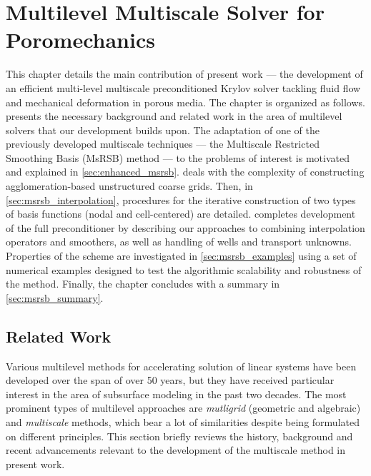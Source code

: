 \chapter{Multilevel Multiscale Solver for Poromechanics}
\label{ch:multiscale_poromechanics}

This chapter details the main contribution of present work --- the development of an efficient multi-level multiscale preconditioned Krylov solver tackling fluid flow and mechanical deformation in porous media. The chapter is organized as follows.  presents the necessary background and related work in the area of multilevel solvers that our development builds upon. The adaptation of one of the previously developed multiscale techniques --- the Multiscale Restricted Smoothing Basis (MsRSB) method --- to the problems of interest is motivated and explained in \cref{sec:enhanced_msrsb}.    deals with the complexity of constructing agglomeration-based unstructured coarse grids.   Then, in \cref{sec:msrsb_interpolation}, procedures for the iterative construction of two types of basis functions (nodal and cell-centered) are detailed.    completes development of the full preconditioner by describing our approaches to combining interpolation operators and smoothers, as well as handling of wells and transport unknowns.   Properties of the scheme are investigated in \cref{sec:msrsb_examples} using a set of numerical examples designed to test the algorithmic scalability and robustness of the method.   Finally, the chapter concludes with a summary in \cref{sec:msrsb_summary}.

\section{Related Work}
\label{sec:related_work}

Various multilevel methods for accelerating solution of linear systems have been developed over the span of over 50 years, but they have received particular interest in the area of subsurface modeling in the past two decades.    The most prominent types of multilevel approaches are \textit{mutligrid} (geometric and algebraic) and \textit{multiscale} methods, which bear a lot of similarities despite being formulated on different principles.    This section briefly reviews the history, background and recent advancements relevant to the development of the multiscale method in present work.

